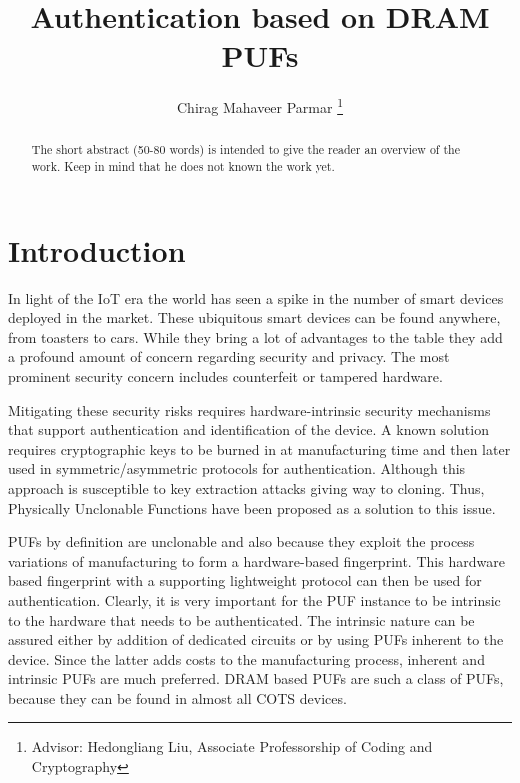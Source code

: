 \documentclass[journal, a4paper]{IEEEtran}
\begin{document}
\title{Authentication based on DRAM PUFs}
\author{Chirag Mahaveer Parmar
\thanks{Advisor: Hedongliang Liu, Associate Professorship of Coding and Cryptography}}
\maketitle

\begin{abstract}
The short abstract (50-80 words) is intended to give the reader an overview of the work.
Keep in mind that he does not known the work yet.
\end{abstract}

\section{Introduction}
 In light of the IoT era the world has seen a spike in the number of smart devices deployed in the market. These ubiquitous smart devices can be found anywhere, from toasters to cars. While they bring a lot of advantages to the table they add a profound amount of concern regarding security and privacy. \cite{EMVT12} The most prominent security concern includes counterfeit or tampered hardware. \cite{PEC06} 

Mitigating these security risks requires hardware-intrinsic security mechanisms that support authentication and identification of the device. A known solution requires cryptographic keys to be burned in at manufacturing time and then later used in symmetric/asymmetric protocols for authentication. Although this approach is susceptible to key extraction attacks giving way to cloning. Thus, Physically Unclonable Functions have been proposed as a solution to this issue.

PUFs by definition are unclonable and also because they exploit the process variations of manufacturing to form a hardware-based fingerprint. This hardware based fingerprint with a supporting lightweight protocol can then be used for authentication. Clearly, it is very important for the PUF instance to be intrinsic to the hardware that needs to be authenticated. The intrinsic nature can be assured either by addition of dedicated circuits or by using PUFs inherent to the device. Since the latter adds costs to the manufacturing process, inherent and intrinsic PUFs are much preferred. DRAM based PUFs are such a class of PUFs, because they can be found in almost all COTS devices.
\end{document}
